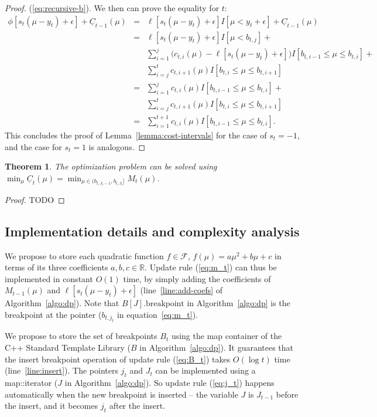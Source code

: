 \documentclass{article}
\newtheorem{theorem}{Theorem}
\begin{document}
\begin{proof}
(\ref{eq:recursive-b}). We then can prove the equality for $t$:
\begin{eqnarray}
  \phi[s_t(\mu-y_t)+\epsilon] + \underline C_{t-1}(\mu)
&=& \ell[s_t(\mu-y_t)+\epsilon] I[\mu<y_t+\epsilon]+\underline C_{t-1}(\mu)\\
&=& \ell[s_t(\mu-y_t)+\epsilon] I[\mu<b_{t,j}]+\nonumber\\
 &&\sum_{i=1}^{j} \big(c_{t,i}(\mu)-\ell[s_t(\mu-y_t)+\epsilon]\big)I[b_{t,i-1}\leq\mu\leq b_{t,i}]+\nonumber\\
      &&\sum_{i=j}^{t} c_{t,i+1}(\mu)I[b_{t,i}\leq \mu\leq b_{t,i+1}]\\
 &=&\sum_{i=1}^{j} c_{t,i}(\mu)I[b_{t,i-1}\leq\mu\leq b_{t,i}]+\nonumber\\
      &&\sum_{i=j}^{t} c_{t,i+1}(\mu)I[b_{t,i}\leq \mu\leq b_{t,i+1}]\\
 &=&\sum_{i=1}^{t+1} c_{t,i}(\mu)I[b_{t,i-1}\leq\mu\leq b_{t,i}].
\end{eqnarray}
This concludes the proof of Lemma~\ref{lemma:cost-intervals} for the
case of $s_t=-1$, and the case for $s_t=1$ is analogous.
\end{proof}


\begin{theorem}
  The optimization problem can be solved using
  $\min_\mu\underline
  C_t(\mu)=\min_{\mu\in(b_{t,J_t-1},b_{t,J_t}]}M_t(\mu)$.
\end{theorem}

\begin{proof}
  TODO
\end{proof}

\subsection{Implementation details and complexity analysis}

We propose to store each quadratic function $f\in\mathcal F$,
$f(\mu)=a\mu^2 + b\mu + c$ in terms of its three coefficients
$a,b,c\in\mathbb R$. Update rule (\ref{eq:m_t}) can thus be
implemented in constant $O(1)$ time, by simply adding the coefficients of
$M_{t-1}(\mu)$ and $\ell[s_t(\mu-y_t)+\epsilon]$
(line~\ref{line:add-coefs} of Algorithm~\ref{algo:dp}). Note that
$B[J].\text{breakpoint}$ in Algorithm~\ref{algo:dp} is the 
breakpoint at the pointer ($b_{t,j_t}$ in equation~\ref{eq:m_t}).

We propose to store the set of breakpoints $B_t$ using the map
container of the C++ Standard Template Library ($B$ in
Algorithm~\ref{algo:dp}). It guarantees that the insert breakpoint
operation of update rule (\ref{eq:B_t}) takes $O(\log t)$ time
(line~\ref{line:insert}). The pointers $j_t$ and $J_t$ can be implemented
using a map::iterator ($J$ in Algorithm~\ref{algo:dp}). So update rule
(\ref{eq:j_t}) happens automatically when the new breakpoint is
inserted -- the variable $J$ is $J_{t-1}$ before the insert, and it
becomes $j_t$ after the insert.
\end{document}
